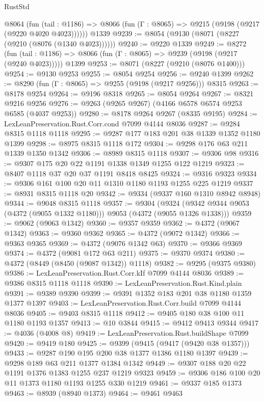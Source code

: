 \begin{lexlean}{RustStd}
\begin{coremodule}
    @8064
      (fun (tail : @1186) => @8066 (fun (Γ : @8065) => @9215 (@9198 (@9217 (@9220 @4020 @4023))))))
    @1339
@9239 := @8054 (@9130 (@8071 (@8227 (@9210 (@8076 (@1340 @4023))))))
@9240 := @9220 @1339
@9249 := @8272
    (fun (tail : @1186) => @8066 (fun (Γ : @8065) => @9239 (@9198 (@9217 (@9240 @4023)))))
    @1399
@9253 := @8071 (@8227 (@9210 (@8076 @1400)))
@9254 := @9130 @9253
@9255 := @8054 @9254
@9256 := @9240 @1399
@9262 := @8290 (fun (Γ : @8065) => @9255 (@9198 (@9217 @9256))) @8315
@9263 := @8178 @9254
@9264 := @9196 @8318
@9265 := @8054 @9264
@9267 := @8321 @9216 @9256
@9276 := @9263 (@9265 @9267) (@4166 @6578 @6574 @9253 @6585 (@4037 @9253))
@9280 := @8178 @9264 @9267 (@8335 @9195)
@9284 := LexLeanPreservation.Rust.Corr.cond @7099 @4144 @8036
@9287 := @9284 @8315 @1118 @1118
@9295 := @9287 @177 @183 @201 @38 @1339 @1352 @1180 @1399
@9298 := @8975 @8315 @1118 @172
@9304 := @9298 @176 @63 @211 @1339 @1350 @1342
@9306 := @8989 @8315 @1118
@9307 := @9306 @98
@9316 := @9307 @175 @20 @22 @1191 @1338 @1349 @1255 @122 @1219
@9323 := @8407 @1118 @37 @20 @37 @1191 @8418 @8425
@9324 := @9316 @9323
@9334 := @9306 @161 @100 @20 @11 @1310 @1180 @1193 @1255 @225 @1219
@9337 := @8931 @8315 @1118 @20
@9342 := @9334 (@9337 @160 @1310 @8942 @8948)
@9344 := @9048 @8315 @1118
@9357 := @9304
    (@9324 (@9342 @9344 @9053 (@4372 (@9055 @1332 @1180))) @9053 (@4372 (@9055 @1326 @1338)))
@9359 := @9062 (@9063 @1342)
@9360 := @9357 @9359
@9362 := @4372 (@9067 @1342)
@9363 := @9360 @9362
@9365 := @4372 (@9072 @1342)
@9366 := @9363 @9365
@9369 := @4372 (@9076 @1342 @63)
@9370 := @9366 @9369
@9374 := @4372 (@9081 @172 @63 @211)
@9375 := @9370 @9374
@9380 := @4372 (@8449 (@8450 (@9087 @1342)) @1118)
@9382 := @9295 (@9375 @9380)
@9386 := LexLeanPreservation.Rust.Corr.kIf @7099 @4144 @8036
@9389 := @9386 @8315 @1118 @1118
@9390 := LexLeanPreservation.Rust.Kind.plain
@9391 := @9389 @9390
@9399 := @9391 @1352 @183 @201 @38 @1180 @1359 @1377 @1397
@9403 := LexLeanPreservation.Rust.Corr.build @7099 @4144 @8036
@9405 := @9403 @8315 @1118
@9412 := @9405 @180 @38 @100 @11 @1180 @1193 @1357
@9413 := @10 @3844
@9415 := @9412 @9413 @9344
@9417 := @4036 (@4008 @8)
@9419 := LexLeanPreservation.Rust.buildShape @7099
@9420 := @9419 @180
@9425 := @9399 (@9415 (@9417 (@9420 @38 @1357)))
@9433 := @9287 @190 @195 @200 @38 @1377 @1386 @1180 @1397
@9439 := @9298 @189 @63 @211 @1377 @1384 @1342
@9449 := @9307 @188 @20 @22 @1191 @1376 @1383 @1255 @237 @1219 @9323
@9459 := @9306 @186 @100 @20 @11 @1373 @1180 @1193 @1255 @330 @1219
@9461 := @9337 @185 @1373
@9463 := @8939 (@8940 @1373)
@9464 := @9461 @9463

\end{coremodule}
\end{lexlean}
